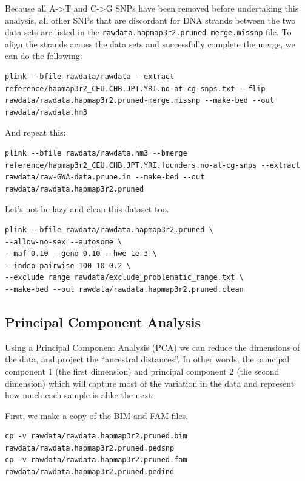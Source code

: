 \documentclass[
]{book}
\begin{document}
Because all A-\textgreater T and C-\textgreater G SNPs have been removed before undertaking this analysis, all other SNPs that are discordant for DNA strands between the two data sets are listed in the \texttt{rawdata.hapmap3r2.pruned-merge.missnp} file. To align the strands across the data sets and successfully complete the merge, we can do the following:

\begin{verbatim}
plink --bfile rawdata/rawdata --extract reference/hapmap3r2_CEU.CHB.JPT.YRI.no-at-cg-snps.txt --flip rawdata/rawdata.hapmap3r2.pruned-merge.missnp --make-bed --out rawdata/rawdata.hm3
\end{verbatim}

And repeat this:

\begin{verbatim}
plink --bfile rawdata/rawdata.hm3 --bmerge reference/hapmap3r2_CEU.CHB.JPT.YRI.founders.no-at-cg-snps --extract rawdata/raw-GWA-data.prune.in --make-bed --out rawdata/rawdata.hapmap3r2.pruned
\end{verbatim}

Let's not be lazy and clean this dataset too.

\begin{verbatim}
plink --bfile rawdata/rawdata.hapmap3r2.pruned \
--allow-no-sex --autosome \
--maf 0.10 --geno 0.10 --hwe 1e-3 \
--indep-pairwise 100 10 0.2 \
--exclude range rawdata/exclude_problematic_range.txt \
--make-bed --out rawdata/rawdata.hapmap3r2.pruned.clean
\end{verbatim}

\hypertarget{principal-component-analysis}{%
\subsection{Principal Component Analysis}\label{principal-component-analysis}}

Using a Principal Component Analysis (PCA) we can reduce the dimensions of the data, and project the ``ancestral distances''. In other words, the principal component 1 (the first dimension) and principal component 2 (the second dimension) which will capture most of the variation in the data and represent how much each sample is alike the next.

First, we make a copy of the BIM and FAM-files.

\begin{verbatim}
cp -v rawdata/rawdata.hapmap3r2.pruned.bim rawdata/rawdata.hapmap3r2.pruned.pedsnp
cp -v rawdata/rawdata.hapmap3r2.pruned.fam rawdata/rawdata.hapmap3r2.pruned.pedind
\end{verbatim}
\end{document}
